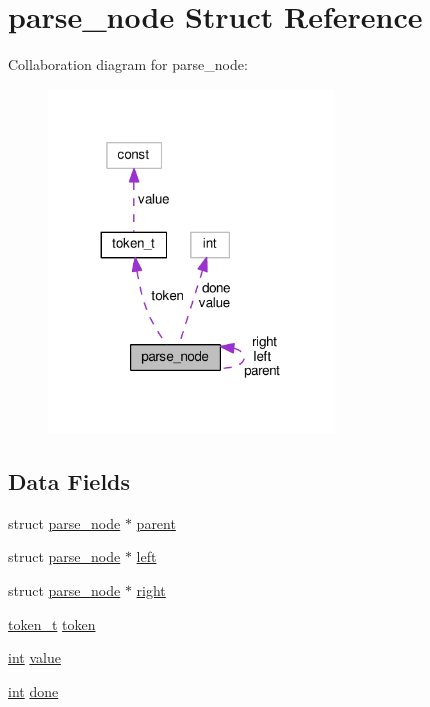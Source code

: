\hypertarget{structparse__node}{}\section{parse\+\_\+node Struct Reference}
\label{structparse__node}


Collaboration diagram for parse\+\_\+node\+:
\nopagebreak
\begin{figure}[H]
\begin{center}
\leavevmode
\includegraphics[width=215pt]{structparse__node__coll__graph}
\end{center}
\end{figure}
\subsection*{Data Fields}
\begin{DoxyCompactItemize}
\item 
struct \hyperlink{structparse__node}{parse\+\_\+node} $\ast$ \hyperlink{structparse__node_abf50c2b0dbe9fb65b7707b02724358c2}{parent}
\item 
struct \hyperlink{structparse__node}{parse\+\_\+node} $\ast$ \hyperlink{structparse__node_ab9a24e48447a6cbbe34cdb8ff364578b}{left}
\item 
struct \hyperlink{structparse__node}{parse\+\_\+node} $\ast$ \hyperlink{structparse__node_afeafa07d7177ac8d4c395f9a8a9575bf}{right}
\item 
\hyperlink{structtoken__t}{token\+\_\+t} \hyperlink{structparse__node_a86e3215f763b4feb8b56f17cdb5301c5}{token}
\item 
\hyperlink{pcre_8txt_a42dfa4ff673c82d8efe7144098fbc198}{int} \hyperlink{structparse__node_a3338c5402643aa9575af67972f8a632f}{value}
\item 
\hyperlink{pcre_8txt_a42dfa4ff673c82d8efe7144098fbc198}{int} \hyperlink{structparse__node_ac5e740e51f5c8c2bda60c932d1892359}{done}
\end{DoxyCompactItemize}



